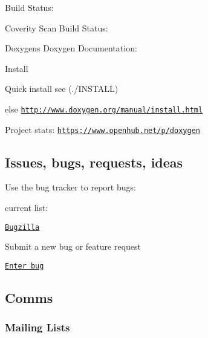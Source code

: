 \begin{DoxyItemize}
\item Build Status\+: \href{https://travis-ci.org/doxygen/doxygen}{\tt }
\item Coverity Scan Build Status\+: \href{https://scan.coverity.com/projects/2860}{\tt }
\item Doxygen\textquotesingle{}s Doxygen Documentation\+: \href{https://codedocs.xyz/doxygen/doxygen/}{\tt }
\item Install
\begin{DoxyItemize}
\item Quick install see (./\+I\+N\+S\+T\+A\+LL)
\item else \href{http://www.doxygen.org/manual/install.html}{\tt http\+://www.\+doxygen.\+org/manual/install.\+html}
\end{DoxyItemize}
\item Project stats\+: \href{https://www.openhub.net/p/doxygen}{\tt https\+://www.\+openhub.\+net/p/doxygen}
\end{DoxyItemize}

\subsection*{Issues, bugs, requests, ideas }

Use the bug tracker to report bugs\+:
\begin{DoxyItemize}
\item current list\+:
\begin{DoxyItemize}
\item \href{https://bugzilla.gnome.org/buglist.cgi?product=doxygen&bug_status=UNCONFIRMED&bug_status=NEW&bug_status=ASSIGNED&bug_status=REOPENED}{\tt Bugzilla}
\end{DoxyItemize}
\item Submit a new bug or feature request
\begin{DoxyItemize}
\item \href{https://bugzilla.gnome.org/enter_bug.cgi?product=doxygen}{\tt Enter bug}
\end{DoxyItemize}
\end{DoxyItemize}

\subsection*{Comms }

\subsubsection*{Mailing Lists}


